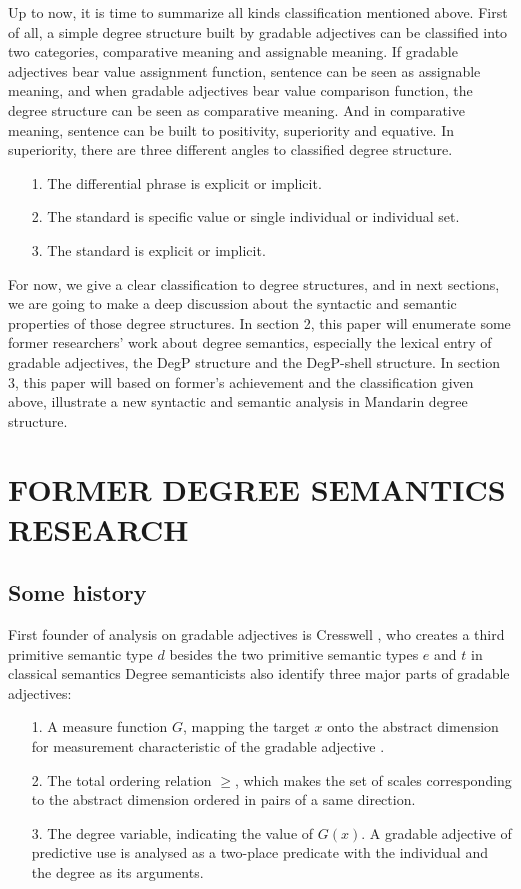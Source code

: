 \documentclass{ctexart}
\let \cite \parencite
\begin{document}
Up to now, it is time to summarize all kinds classification mentioned above. First of all, a simple degree structure built by gradable adjectives can be classified into two categories, comparative meaning and assignable meaning. If gradable adjectives bear value assignment function, sentence can be seen as assignable meaning, and when gradable adjectives bear value comparison function, the degree structure can be seen as comparative meaning. And in comparative meaning, sentence can be built to positivity, superiority and equative. In superiority, there are three different angles to classified degree structure. 

\begin{itemize}
    \item[1.] The differential phrase is explicit or implicit.
    \item[2.] The standard is specific value or single individual or individual set.
    \item[3.] The standard is explicit or implicit.
\end{itemize}

\noindent
For now, we give a clear classification to degree structures, and in next sections, we are going to make a deep discussion about the syntactic and semantic properties of those degree structures. In section 2, this paper will enumerate some former researchers' work about degree semantics, especially the lexical entry of gradable adjectives, the DegP structure and the DegP-shell structure. In section 3, this paper will based on former's achievement and the classification given above, illustrate a new syntactic and semantic analysis in Mandarin degree structure.

\section{FORMER DEGREE SEMANTICS RESEARCH}

\subsection{Some history}

\noindent
First founder of analysis on gradable adjectives is Cresswell \cite{cresswell1976}, who creates a third primitive semantic type $d$ besides the two primitive semantic types $e$ and $t$ in classical semantics Degree semanticists also identify three major parts of gradable adjectives:

\begin{itemize}
    \item[1.] A measure function $G$, mapping the target $x$ onto the abstract dimension for measurement characteristic of the gradable adjective \cite{bartsch1974}.
    \item[2.] The total ordering relation $\geq$, which makes the set of scales corresponding to the abstract dimension ordered in pairs of a same direction.
    \item[3.] The degree variable, indicating the value of $G(x)$. A gradable adjective of predictive use is analysed as a two-place predicate with the individual and the degree as its arguments.
\end{itemize}
\end{document}
